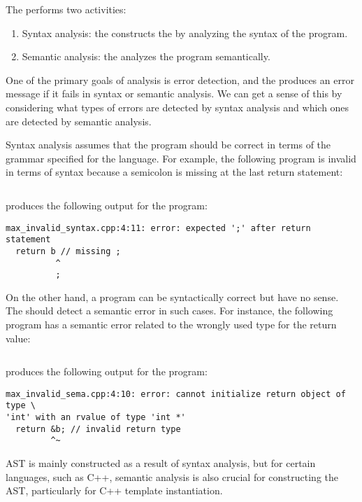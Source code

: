 The \parser performs two activities:
\begin{enumerate}
\item Syntax analysis: the \parser constructs the \myast by analyzing the syntax
  of the program. 
\item Semantic analysis: the \parser analyzes the program semantically.
\end{enumerate}

One of the primary goals of analysis is error detection, and the \parser
produces an error message if it fails in syntax or semantic analysis. We can get
a sense of this by considering what types of errors are detected by syntax
analysis and which ones are detected by semantic analysis. 

Syntax analysis assumes that the program should be correct in terms of the
grammar specified for the language. For example, the following program is
invalid in terms of syntax because a semicolon is missing at the last return
statement: 

\inputminted{c++}{./src/part1/ch2_arch/max_invalid_syntax.cpp}

\clang produces the following output for the program:
\begin{adjustwidth}{0em}{0em}
\begin{verbatim}
max_invalid_syntax.cpp:4:11: error: expected ';' after return statement
  return b // missing ;
          ^
          ;
\end{verbatim}
\end{adjustwidth}

On the other hand, a program can be syntactically correct but have no sense. The
\parser should detect a semantic error in such cases. For instance, the
following program has a semantic error related to the wrongly used type for the
return value: 
\inputminted{c++}{./src/part1/ch2_arch/max_invalid_sema.cpp}
\clang produces the following output for the program:
\begin{adjustwidth}{0em}{0em}
\begin{verbatim}
max_invalid_sema.cpp:4:10: error: cannot initialize return object of type \
'int' with an rvalue of type 'int *'
  return &b; // invalid return type
         ^~
\end{verbatim}
\end{adjustwidth}

AST is mainly constructed as a result of syntax analysis, but for certain
languages, such as C++, semantic analysis is also crucial for constructing the
AST, particularly for C++ template instantiation. 


